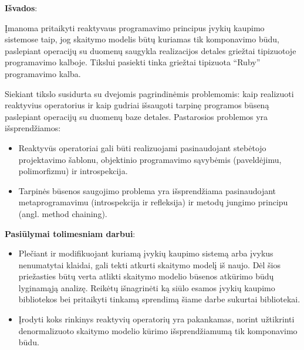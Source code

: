 \documentclass{VUMIFPSmagistrinis}
\begin{document}
\textbf{Išvados}:

Įmanoma pritaikyti reaktyvaus programavimo principus įvykių kaupimo sistemose taip, jog skaitymo modelis būtų kuriamas tik komponavimo būdu, paslepiant operacijų su duomenų saugykla realizacijos detales griežtai tipizuotoje programavimo kalboje. Tikslui pasiekti tinka griežtai tipizuota ``Ruby'' programavimo kalba.

Siekiant tikslo susidurta su dvejomis pagrindinėmis problemomis: kaip realizuoti reaktyvius operatorius ir kaip gudriai išsaugoti tarpinę programos būseną paslepiant operacijų su duomenų baze detales. Pastarosios problemos yra išsprendžiamos:

\begin{itemize}
  \item Reaktyvūs operatoriai gali būti realizuojami pasinaudojant stebėtojo projektavimo šablonu, objektinio programavimo sąvybėmis (paveldėjimu, polimorfizmu) ir introspekcija.
  \item Tarpinės būsenos saugojimo problema yra išsprendžiama pasinaudojant metaprogramavimu (introspekcija ir refleksija) ir metodų jungimo principu (angl. method chaining).
\end{itemize}

\textbf{Pasiūlymai tolimesniam darbui}:

\begin{itemize}
  \item Plečiant ir modifikuojant kuriamą įvykių kaupimo sistemą arba įvykus nenumatytai klaidai, gali tekti atkurti skaitymo modelį iš naujo. Dėl šios priežasties būtų verta atlikti skaitymo modelio būsenos atkūrimo būdų lyginamąją analizę. Reikėtų išnagrinėti ką siūlo esamos įvykių kaupimo bibliotekos bei pritaikyti tinkamą sprendimą šiame darbe sukurtai bibliotekai.
  \item Įrodyti koks rinkinys reaktyvių operatorių yra pakankamas, norint užtikrinti denormalizuoto skaitymo modelio kūrimo išsprendžiamumą tik komponavimo būdu.
\end{itemize}

\printbibliography[heading=bibintoc]




\end{document}
